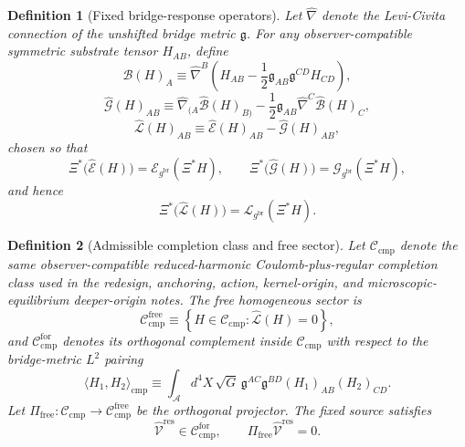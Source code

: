 \documentclass[11pt]{article}
\newcommand{\Sub}{\mathcal A}
\newcommand{\ObserverMap}{\Xi}
\newcommand{\BridgeMetric}{\mathfrak g}
\newcommand{\ObserverMetric}{g^{\mathrm{br}}}
\newcommand{\ResidualLift}{\widehat{\mathcal V}^{\mathrm{res}}}
\newcommand{\SubEinLin}{\widehat{\mathcal E}}
\newcommand{\SubGaugeVec}{\widehat{\mathcal B}}
\newcommand{\SubGaugeBook}{\widehat{\mathcal G}}
\newcommand{\SubReducedEin}{\widehat{\mathcal L}}
\newcommand{\FreeProj}{\Pi_{\mathrm{free}}}
\newcommand{\ReducedEin}{\mathcal L_{\ObserverMetric}}
\newcommand{\GaugeBook}{\mathcal G_{\ObserverMetric}}
\newcommand{\EinLin}{\mathcal E_{\ObserverMetric}}
\newcommand{\CompClass}{\mathscr C_{\mathrm{cmp}}}
\newcommand{\CompFree}{\mathscr C_{\mathrm{cmp}}^{\mathrm{free}}}
\newcommand{\CompForced}{\mathscr C_{\mathrm{cmp}}^{\mathrm{for}}}
\newtheorem{definition}{Definition}
\begin{document}
\begin{definition}[Fixed bridge-response operators]
\label{def:operators}
Let \(\widehat\nabla\) denote the Levi-Civita connection of the unshifted bridge metric \(\BridgeMetric\). For any observer-compatible symmetric substrate tensor \(H_{AB}\), define
\begin{equation}
\SubGaugeVec(H)_A
\equiv
\widehat\nabla^B\!\left(
H_{AB}
-\frac12 \BridgeMetric_{AB}\BridgeMetric^{CD}H_{CD}
\right),
\label{eq:subB}
\end{equation}
\begin{equation}
\SubGaugeBook(H)_{AB}
\equiv
\widehat\nabla_{(A}\SubGaugeVec(H)_{B)}
-\frac12 \BridgeMetric_{AB}\widehat\nabla^C\SubGaugeVec(H)_C,
\label{eq:subG}
\end{equation}
\begin{equation}
\SubReducedEin(H)_{AB}
\equiv
\SubEinLin(H)_{AB}-\SubGaugeBook(H)_{AB},
\label{eq:subL}
\end{equation}
chosen so that
\begin{equation}
\ObserverMap^*\bigl(\SubEinLin(H)\bigr)=\EinLin(\ObserverMap^*H),
\qquad
\ObserverMap^*\bigl(\SubGaugeBook(H)\bigr)=\GaugeBook(\ObserverMap^*H),
\label{eq:intertwine1}
\end{equation}
and hence
\begin{equation}
\ObserverMap^*\bigl(\SubReducedEin(H)\bigr)
=
\ReducedEin(\ObserverMap^*H).
\label{eq:intertwine2}
\end{equation}
\end{definition}

\begin{definition}[Admissible completion class and free sector]
\label{def:class}
Let \(\CompClass\) denote the same observer-compatible reduced-harmonic Coulomb-plus-regular completion class used in the redesign, anchoring, action, kernel-origin, and microscopic-equilibrium deeper-origin notes. The free homogeneous sector is
\begin{equation}
\CompFree
\equiv
\left\{
H\in\CompClass:\SubReducedEin(H)=0
\right\},
\label{eq:freeclass}
\end{equation}
and \(\CompForced\) denotes its orthogonal complement inside \(\CompClass\) with respect to the bridge-metric \(L^2\) pairing
\begin{equation}
\langle H_1,H_2\rangle_{\mathrm{cmp}}
\equiv
\int_{\Sub} d^4X\,\sqrt{G}\,
\BridgeMetric^{AC}\BridgeMetric^{BD}(H_1)_{AB}(H_2)_{CD}.
\label{eq:inner}
\end{equation}
Let \(\FreeProj:\CompClass\to\CompFree\) be the orthogonal projector. The fixed source satisfies
\begin{equation}
\ResidualLift\in\CompForced,
\qquad
\FreeProj\ResidualLift=0.
\label{eq:sourcefree}
\end{equation}
\end{definition}
\end{document}
